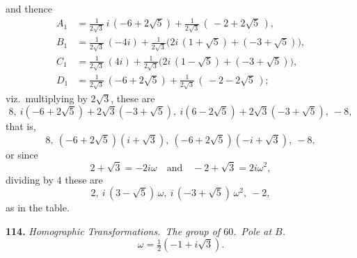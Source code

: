\documentclass[11pt]{article}
\newcommand{\artno}[1]{\textbf{#1.}\quad}
\begin{document}
\bigskip
\noindent
and thence
\begin{align*}
  A_{1} &= \tfrac{1}{2\sqrt{3}}\,i\,(-6 + 2\sqrt{5})
          + \tfrac{1}{2\sqrt{3}}\,(\,-2 + 2\sqrt{5}\,),\\
  B_{1} &= \tfrac{1}{2\sqrt{3}}\,(-4i)
          + \tfrac{1}{2\sqrt{3}}\bigl(2i\,(1 + \sqrt{5}) + (-3 + \sqrt{5})\bigr),\\
  C_{1} &= \tfrac{1}{2\sqrt{3}}\,(4i)
          + \tfrac{1}{2\sqrt{3}}\bigl(2i\,(1 - \sqrt{5}) + (-3 + \sqrt{5})\bigr),\\
  D_{1} &= \tfrac{1}{2\sqrt{3}}\,(-6 + 2\sqrt{5})
          + \tfrac{1}{2\sqrt{3}}\,(\,-2 - 2\sqrt{5}\,);
\end{align*}
viz.\ multiplying by $2\sqrt{3}$, these are
\[
  8,\ i(-6 + 2\sqrt{5}) + 2\sqrt{3}(-3 + \sqrt{5}),
  \ i(6 - 2\sqrt{5}) + 2\sqrt{3}(-3 + \sqrt{5}),\ -8,
\]
that is,
\[
  8,\ (-6 + 2\sqrt{5})(i + \sqrt{3}),\ (-6 + 2\sqrt{5})(-i + \sqrt{3}),\ -8,
\]
or since
\[
  2 + \sqrt{3} = -2 i \omega \quad\text{and}\quad -2 + \sqrt{3} = 2 i \omega^{2},
\]
dividing by $4$ these are
\[
  2,\ i\,(3 - \sqrt{5})\,\omega,\ i\,(-3 + \sqrt{5})\,\omega^{2},\ -2,
\]
as in the table.

\medskip
\noindent
\artno{114} \textit{Homographic Transformations.\ The group of $60$.\
Pole at $B$.}
\[
  \omega = \tfrac{1}{2}(-1 + i\sqrt{3}).
\]
\end{document}

